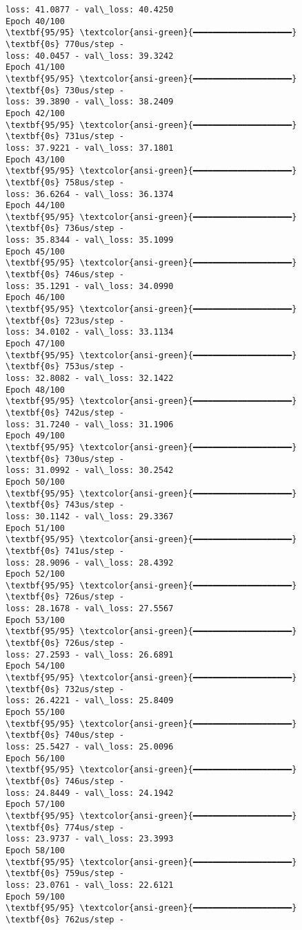 \documentclass[11pt]{article}
\begin{document}
\begin{Verbatim}[commandchars=\\\{\}]
loss: 41.0877 - val\_loss: 40.4250
Epoch 40/100
\textbf{95/95} \textcolor{ansi-green}{━━━━━━━━━━━━━━━━━━━━} \textbf{0s} 770us/step -
loss: 40.0457 - val\_loss: 39.3242
Epoch 41/100
\textbf{95/95} \textcolor{ansi-green}{━━━━━━━━━━━━━━━━━━━━} \textbf{0s} 730us/step -
loss: 39.3890 - val\_loss: 38.2409
Epoch 42/100
\textbf{95/95} \textcolor{ansi-green}{━━━━━━━━━━━━━━━━━━━━} \textbf{0s} 731us/step -
loss: 37.9221 - val\_loss: 37.1801
Epoch 43/100
\textbf{95/95} \textcolor{ansi-green}{━━━━━━━━━━━━━━━━━━━━} \textbf{0s} 758us/step -
loss: 36.6264 - val\_loss: 36.1374
Epoch 44/100
\textbf{95/95} \textcolor{ansi-green}{━━━━━━━━━━━━━━━━━━━━} \textbf{0s} 736us/step -
loss: 35.8344 - val\_loss: 35.1099
Epoch 45/100
\textbf{95/95} \textcolor{ansi-green}{━━━━━━━━━━━━━━━━━━━━} \textbf{0s} 746us/step -
loss: 35.1291 - val\_loss: 34.0990
Epoch 46/100
\textbf{95/95} \textcolor{ansi-green}{━━━━━━━━━━━━━━━━━━━━} \textbf{0s} 723us/step -
loss: 34.0102 - val\_loss: 33.1134
Epoch 47/100
\textbf{95/95} \textcolor{ansi-green}{━━━━━━━━━━━━━━━━━━━━} \textbf{0s} 753us/step -
loss: 32.8082 - val\_loss: 32.1422
Epoch 48/100
\textbf{95/95} \textcolor{ansi-green}{━━━━━━━━━━━━━━━━━━━━} \textbf{0s} 742us/step -
loss: 31.7240 - val\_loss: 31.1906
Epoch 49/100
\textbf{95/95} \textcolor{ansi-green}{━━━━━━━━━━━━━━━━━━━━} \textbf{0s} 730us/step -
loss: 31.0992 - val\_loss: 30.2542
Epoch 50/100
\textbf{95/95} \textcolor{ansi-green}{━━━━━━━━━━━━━━━━━━━━} \textbf{0s} 743us/step -
loss: 30.1142 - val\_loss: 29.3367
Epoch 51/100
\textbf{95/95} \textcolor{ansi-green}{━━━━━━━━━━━━━━━━━━━━} \textbf{0s} 741us/step -
loss: 28.9096 - val\_loss: 28.4392
Epoch 52/100
\textbf{95/95} \textcolor{ansi-green}{━━━━━━━━━━━━━━━━━━━━} \textbf{0s} 726us/step -
loss: 28.1678 - val\_loss: 27.5567
Epoch 53/100
\textbf{95/95} \textcolor{ansi-green}{━━━━━━━━━━━━━━━━━━━━} \textbf{0s} 726us/step -
loss: 27.2593 - val\_loss: 26.6891
Epoch 54/100
\textbf{95/95} \textcolor{ansi-green}{━━━━━━━━━━━━━━━━━━━━} \textbf{0s} 732us/step -
loss: 26.4221 - val\_loss: 25.8409
Epoch 55/100
\textbf{95/95} \textcolor{ansi-green}{━━━━━━━━━━━━━━━━━━━━} \textbf{0s} 740us/step -
loss: 25.5427 - val\_loss: 25.0096
Epoch 56/100
\textbf{95/95} \textcolor{ansi-green}{━━━━━━━━━━━━━━━━━━━━} \textbf{0s} 746us/step -
loss: 24.8449 - val\_loss: 24.1942
Epoch 57/100
\textbf{95/95} \textcolor{ansi-green}{━━━━━━━━━━━━━━━━━━━━} \textbf{0s} 774us/step -
loss: 23.9737 - val\_loss: 23.3993
Epoch 58/100
\textbf{95/95} \textcolor{ansi-green}{━━━━━━━━━━━━━━━━━━━━} \textbf{0s} 759us/step -
loss: 23.0761 - val\_loss: 22.6121
Epoch 59/100
\textbf{95/95} \textcolor{ansi-green}{━━━━━━━━━━━━━━━━━━━━} \textbf{0s} 762us/step -

\end{Verbatim}
\end{document}
